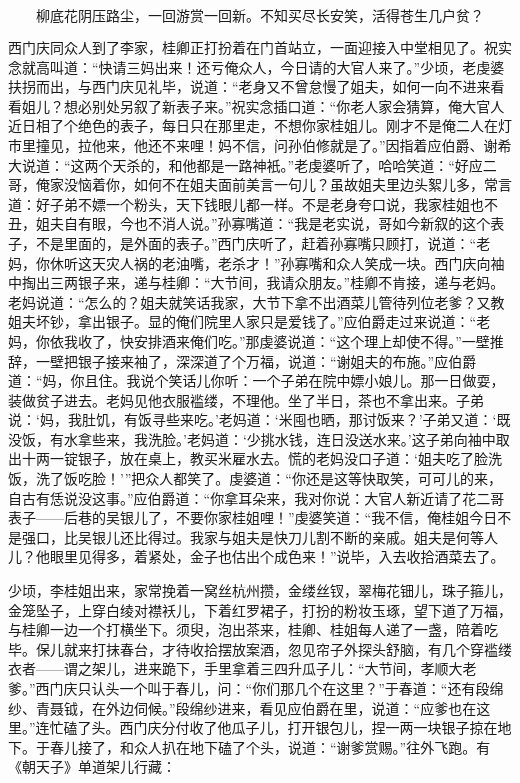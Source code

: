 \[
柳底花阴压路尘，一回游赏一回新。
不知买尽长安笑，活得苍生几户贫？
\]

西门庆同众人到了李家，桂卿正打扮着在门首站立，一面迎接入中堂相见了。祝实念就高叫道：“快请三妈出来！还亏俺众人，今日请的大官人来了。”少顷，老虔婆扶拐而出，与西门庆见礼毕，说道：“老身又不曾怠慢了姐夫，如何一向不进来看看姐儿？想必别处另叙了新表子来。”祝实念插口道：“你老人家会猜算，俺大官人近日相了个绝色的表子，每日只在那里走，不想你家桂姐儿。刚才不是俺二人在灯市里撞见，拉他来，他还不来哩！妈不信，问孙伯修就是了。”因指着应伯爵、谢希大说道：“这两个天杀的，和他都是一路神衹。”老虔婆听了，哈哈笑道：“好应二哥，俺家没恼着你，如何不在姐夫面前美言一句儿？虽故姐夫里边头絮儿多，常言道：好子弟不嫖一个粉头，天下钱眼儿都一样。不是老身夸口说，我家桂姐也不丑，姐夫自有眼，今也不消人说。”孙寡嘴道：“我是老实说，哥如今新叙的这个表子，不是里面的，是外面的表子。”西门庆听了，赶着孙寡嘴只顾打，说道：“老妈，你休听这天灾人祸的老油嘴，老杀才！”孙寡嘴和众人笑成一块。西门庆向袖中掏出三两银子来，递与桂卿：“大节间，我请众朋友。”桂卿不肯接，递与老妈。老妈说道：“怎么的？姐夫就笑话我家，大节下拿不出酒菜儿管待列位老爹？又教姐夫坏钞，拿出银子。显的俺们院里人家只是爱钱了。”应伯爵走过来说道：“老妈，你依我收了，快安排酒来俺们吃。”那虔婆说道：“这个理上却使不得。”一壁推辞，一壁把银子接来袖了，深深道了个万福，说道：“谢姐夫的布施。”应伯爵道：“妈，你且住。我说个笑话儿你听：一个子弟在院中嫖小娘儿。那一日做耍，装做贫子进去。老妈见他衣服褴缕，不理他。坐了半日，茶也不拿出来。子弟说：‘妈，我肚饥，有饭寻些来吃。’老妈道：‘米囤也晒，那讨饭来？’子弟又道：‘既没饭，有水拿些来，我洗脸。’老妈道：‘少挑水钱，连日没送水来。’这子弟向袖中取出十两一锭银子，放在桌上，教买米雇水去。慌的老妈没口子道：‘姐夫吃了脸洗饭，洗了饭吃脸！’”把众人都笑了。虔婆道：“你还是这等快取笑，可可儿的来，自古有恁说没这事。”应伯爵道：“你拿耳朵来，我对你说：大官人新近请了花二哥表子——后巷的吴银儿了，不要你家桂姐哩！”虔婆笑道：“我不信，俺桂姐今日不是强口，比吴银儿还比得过。我家与姐夫是快刀儿割不断的亲戚。姐夫是何等人儿？他眼里见得多，着紧处，金子也估出个成色来！”说毕，入去收拾酒菜去了。

少顷，李桂姐出来，家常挽着一窝丝杭州攒，金缕丝钗，翠梅花钿儿，珠子箍儿，金笼坠子，上穿白绫对襟袄儿，下着红罗裙子，打扮的粉妆玉琢，望下道了万福，与桂卿一边一个打横坐下。须臾，泡出茶来，桂卿、桂姐每人递了一盏，陪着吃毕。保儿就来打抹春台，才待收拾摆放案酒，忽见帘子外探头舒脑，有几个穿褴缕衣者——谓之架儿，进来跪下，手里拿着三四升瓜子儿：“大节间，孝顺大老爹。”西门庆只认头一个叫于春儿，问：“你们那几个在这里？”于春道：“还有段绵纱、青聂钺，在外边伺候。”段绵纱进来，看见应伯爵在里，说道：“应爹也在这里。”连忙磕了头。西门庆分付收了他瓜子儿，打开银包儿，捏一两一块银子掠在地下。于春儿接了，和众人扒在地下磕了个头，说道：“谢爹赏赐。”往外飞跑。有《朝天子》单道架儿行藏：

